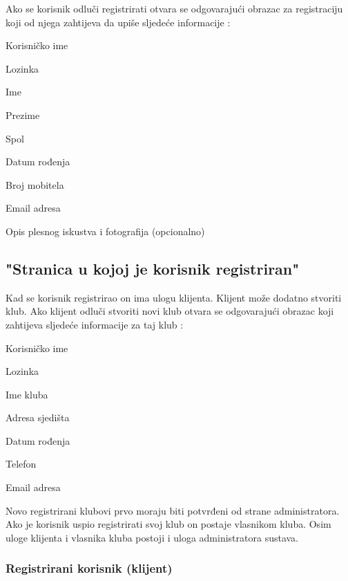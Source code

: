 			Ako se korisnik odluči registrirati otvara se odgovarajući obrazac za registraciju koji od njega zahtijeva da upiše sljedeće informacije :
				
				\begin{packed_item}
					\item Korisničko ime
					\item Lozinka
					\item Ime
					\item Prezime
					\item Spol
					\item Datum rođenja
					\item Broj mobitela
					\item Email adresa
					\item Opis plesnog iskustva i fotografija (opcionalno)
				\end{packed_item}
			\bigskip
			
	
  	\subsection {"Stranica u kojoj je korisnik registriran"}
  	Kad se korisnik registrirao on ima ulogu klijenta. Klijent može dodatno stvoriti klub. Ako klijent odluči stvoriti novi klub otvara se odgovarajući obrazac koji zahtijeva sljedeće informacije za taj klub :
		
		
		\begin{packed_item}
			\item Korisničko ime
			\item Lozinka
			\item Ime kluba
			\item Adresa sjedišta
			\item Datum rođenja
			\item Telefon
			\item Email adresa
		\end{packed_item}
	
	Novo registrirani klubovi prvo moraju biti potvrđeni od strane administratora. Ako je korisnik uspio registrirati svoj klub on postaje vlasnikom kluba. Osim uloge klijenta i vlasnika kluba postoji i uloga administratora sustava.
	
	\bigskip
	\bigskip
	\bigskip
	\bigskip
	\bigskip
	\bigskip
	\bigskip
	
		
		
		
		\subsubsection{Registrirani korisnik (klijent)}
	
